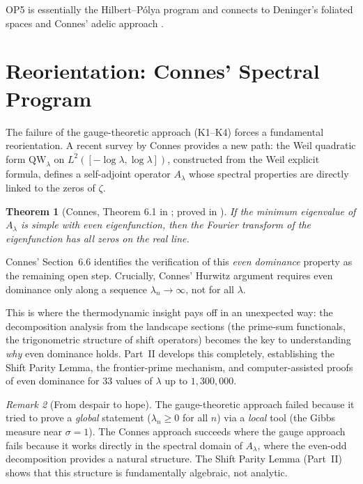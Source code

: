 \documentclass[12pt,a4paper]{article}
\newtheorem{theorem}{Theorem}[section]
\theoremstyle{definition}
\theoremstyle{remark}
\newtheorem{remark}[theorem]{Remark}
\begin{document}
OP5 is essentially the Hilbert--P\'olya program and connects to Deninger's foliated spaces \cite{Deninger2002} and Connes' adelic approach \cite{Connes1999}.


\section{Reorientation: Connes' Spectral Program}
\label{sec:reorientation}

The failure of the gauge-theoretic approach (K1--K4) forces a fundamental reorientation. A recent survey by Connes \cite{Connes2026} provides a new path: the Weil quadratic form $\mathrm{QW}_\lambda$ on $L^2([-\log\lambda, \log\lambda])$, constructed from the Weil explicit formula, defines a self-adjoint operator $A_\lambda$ whose spectral properties are directly linked to the zeros of $\zeta$.

\begin{theorem}[Connes, Theorem 6.1 in \cite{Connes2026}; proved in \cite{ConnesvS2025}]
If the minimum eigenvalue of $A_\lambda$ is simple with even eigenfunction, then the Fourier transform of the eigenfunction has all zeros on the real line.
\end{theorem}

Connes' Section~6.6 identifies the verification of this \emph{even dominance} property as the remaining open step. Crucially, Connes' Hurwitz argument requires even dominance only along a sequence $\lambda_n \to \infty$, not for all $\lambda$.

This is where the thermodynamic insight pays off in an unexpected way: the decomposition analysis from the landscape sections (the prime-sum functionals, the trigonometric structure of shift operators) becomes the key to understanding \emph{why} even dominance holds. Part~II develops this completely, establishing the Shift Parity Lemma, the frontier-prime mechanism, and computer-assisted proofs of even dominance for $33$ values of $\lambda$ up to $1{,}300{,}000$.

\begin{remark}[From despair to hope]
The gauge-theoretic approach failed because it tried to prove a \emph{global} statement ($\lambda_n \geq 0$ for all $n$) via a \emph{local} tool (the Gibbs measure near $\sigma = 1$). The Connes approach succeeds where the gauge approach fails because it works directly in the spectral domain of $A_\lambda$, where the even-odd decomposition provides a natural structure. The Shift Parity Lemma (Part~II) shows that this structure is fundamentally algebraic, not analytic.
\end{remark}
\end{document}
